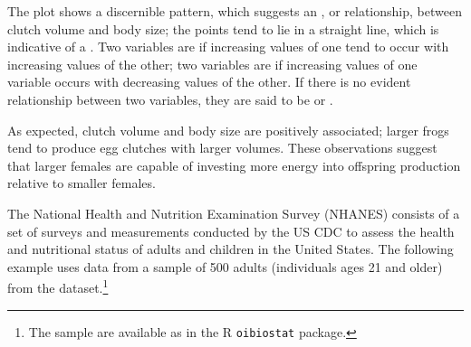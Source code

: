 

The plot shows a discernible pattern, which suggests an , or relationship,  between clutch volume and body size; the points tend to lie in a straight line, which is indicative of a . Two variables are  if increasing values of one tend to occur with increasing values of the other; two variables are  if increasing values of one variable occurs with decreasing values of the other. If there is no evident relationship between two variables, they are said to be  or .

As expected, clutch volume and body size are positively associated; larger frogs tend to produce egg clutches with larger volumes. These observations suggest that larger females are capable of investing more energy into offspring production relative to smaller females.


The National Health and Nutrition Examination Survey (NHANES) consists of a set of surveys and measurements conducted by the US CDC to assess the health and nutritional status of adults and children in the United States. The following example uses data from a sample of 500 adults (individuals ages 21 and older) from the  dataset.\footnote{The sample are available as  in the \textsf{R} \texttt{oibiostat} package.}

